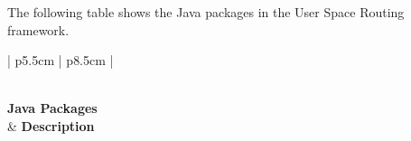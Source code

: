 The following table shows the Java packages
in the User Space Routing framework.



{
  \renewcommand{\arraystretch}{1.6} 
  \renewcommand{\tabcolsep}{1.1ex}



\small

\begin{longtable}[l]{ | p{5.5cm} | p{8.5cm} | }

 \caption{Java Packages} \\
 \hline {} {\textbf{Java Packages}}\\
  & {\textbf{Description}} \\
 \endhead




\end{longtable}}

